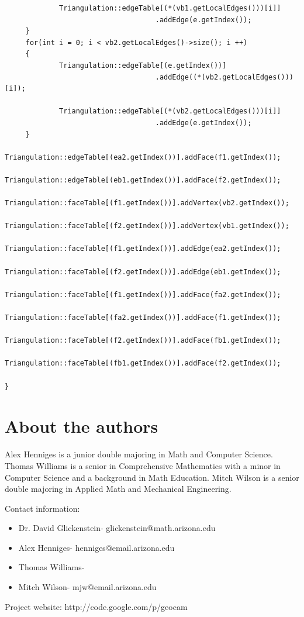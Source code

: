 \documentclass[12pt]{article}
\begin{document}
\begin{verbatim}
             Triangulation::edgeTable[(*(vb1.getLocalEdges()))[i]]
             						.addEdge(e.getIndex()); 
     }
     for(int i = 0; i < vb2.getLocalEdges()->size(); i ++)
     {
             Triangulation::edgeTable[(e.getIndex())]
             						.addEdge((*(vb2.getLocalEdges()))[i]); 
             						
             Triangulation::edgeTable[(*(vb2.getLocalEdges()))[i]]
             						.addEdge(e.getIndex()); 
     }
     Triangulation::edgeTable[(ea2.getIndex())].addFace(f1.getIndex()); 
     Triangulation::edgeTable[(eb1.getIndex())].addFace(f2.getIndex()); 
     Triangulation::faceTable[(f1.getIndex())].addVertex(vb2.getIndex());
     Triangulation::faceTable[(f2.getIndex())].addVertex(vb1.getIndex());
     Triangulation::faceTable[(f1.getIndex())].addEdge(ea2.getIndex());
     Triangulation::faceTable[(f2.getIndex())].addEdge(eb1.getIndex());
     Triangulation::faceTable[(f1.getIndex())].addFace(fa2.getIndex());
     Triangulation::faceTable[(fa2.getIndex())].addFace(f1.getIndex());
     Triangulation::faceTable[(f2.getIndex())].addFace(fb1.getIndex());
     Triangulation::faceTable[(fb1.getIndex())].addFace(f2.getIndex());
     
}
\end{verbatim}
\section*{About the authors}

Alex Henniges is a junior double majoring in Math and Computer Science. Thomas Williams is a senior in Comprehensive Mathematics with a minor in Computer Science and a background in Math Education. Mitch Wilson is a senior double majoring in Applied Math and Mechanical Engineering.\newline

\noindent Contact information:
\begin{itemize}
\item Dr. David Glickenstein- glickenstein@math.arizona.edu
\item Alex Henniges- henniges@email.arizona.edu
\item Thomas Williams-
\item Mitch Wilson- mjw@email.arizona.edu
\end{itemize}
\noindent Project website: http://code.google.com/p/geocam
\end{document}
